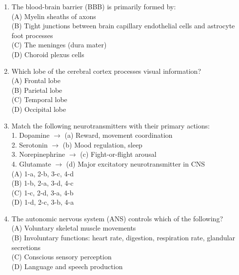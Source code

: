 \documentclass{article}
\begin{document}
\begin{enumerate}[label=Q\arabic*.]
\item The blood-brain barrier (BBB) is primarily formed by:
\\(A) Myelin sheaths of axons
\\(B) Tight junctions between brain capillary endothelial cells and astrocyte foot processes
\\(C) The meninges (dura mater)
\\(D) Choroid plexus cells

\item Which lobe of the cerebral cortex processes visual information?
\\(A) Frontal lobe
\\(B) Parietal lobe
\\(C) Temporal lobe
\\(D) Occipital lobe

\item Match the following neurotransmitters with their primary actions:\\
1. Dopamine $\rightarrow$ (a) Reward, movement coordination\\
2. Serotonin $\rightarrow$ (b) Mood regulation, sleep\\
3. Norepinephrine $\rightarrow$ (c) Fight-or-flight arousal\\
4. Glutamate $\rightarrow$ (d) Major excitatory neurotransmitter in CNS
\\(A) 1-a, 2-b, 3-c, 4-d
\\(B) 1-b, 2-a, 3-d, 4-c
\\(C) 1-c, 2-d, 3-a, 4-b
\\(D) 1-d, 2-c, 3-b, 4-a

\item The autonomic nervous system (ANS) controls which of the following?
\\(A) Voluntary skeletal muscle movements
\\(B) Involuntary functions: heart rate, digestion, respiration rate, glandular secretions
\\(C) Conscious sensory perception
\\(D) Language and speech production

\end{enumerate}
\end{document}
